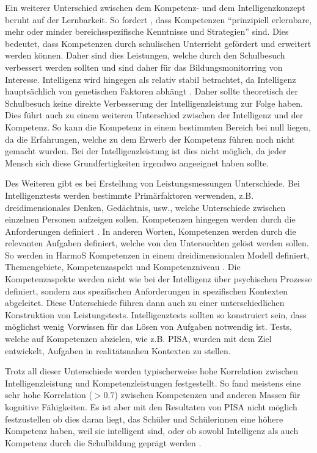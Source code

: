 Ein weiterer Unterschied zwischen dem Kompetenz- und dem Intelligenzkonzept beruht auf der Lernbarkeit. So fordert \citet[S. 22]{Baumert2001}, dass Kompetenzen "`prinzipiell erlernbare, mehr oder minder bereichsspezifische Kenntnisse und Strategien"' sind. Dies bedeutet, dass Kompetenzen durch schulischen Unterricht gefördert und erweitert werden können. Daher sind dies Leistungen, welche durch den Schulbesuch verbessert werden sollten und sind daher für das Bildungsmonitorring von Interesse. Intelligenz wird hingegen als relativ stabil betrachtet, da Intelligenz hauptsächlich von genetischen Faktoren abhängt \citep{Shakeshaft2013}. Daher sollte theoretisch der Schulbesuch keine direkte Verbesserung der Intelligenzleistung zur Folge haben. Dies führt auch zu einem weiteren Unterschied zwischen der Intelligenz und der Kompetenz. So kann die Kompetenz in einem bestimmten Bereich bei null liegen, da die Erfahrungen, welche zu dem Erwerb der Kompetenz führen noch nicht gemacht wurden. Bei der Intelligenzleistung ist dies nicht möglich, da jeder Mensch sich diese Grundfertigkeiten irgendwo angeeignet haben sollte.


Des Weiteren gibt es bei Erstellung von Leistungsmessungen Unterschiede. Bei Intelligenztests werden bestimmte Primärfaktoren verwenden, z.B. dreidimensionales Denken, Gedächtnis, usw., welche Unterschiede zwischen einzelnen Personen aufzeigen sollen. Kompetenzen hingegen werden durch die Anforderungen definiert \citep{Rychen}. In anderen Worten, Kompetenzen werden durch die relevanten Aufgaben definiert, welche von den Untersuchten gelöst werden sollen. So werden in HarmoS Kompetenzen in einem dreidimensionalen Modell definiert, Themengebiete, Kompetenzaspekt und Kompetenzniveau \citep{KonsotriumHarmoSNaturwissenschaften+2010}. Die Kompetenzaspekte werden nicht wie bei der Intelligenz über psychischen Prozesse definiert, sondern aus spezifischen Anforderungen in spezifischen Kontexten abgeleitet. Diese Unterschiede führen dann auch zu einer unterschiedlichen Konstruktion von Leistungstests. Intelligenztests sollten so konstruiert sein, dass möglichst wenig Vorwissen für das Lösen von Aufgaben notwendig ist. Tests, welche auf Kompetenzen abzielen, wie z.B. PISA, wurden mit dem Ziel entwickelt, Aufgaben in realitätsnahen  Kontexten zu stellen. 

Trotz all dieser Unterschiede werden typischerweise hohe Korrelation zwischen Intelligenzleistung und Kompetenzleistungen festgestellt. So fand \citet{Rindermann2006} meistens eine sehr hohe Korrelation ($ > $0.7) zwischen Kompetenzen und anderen Massen für kognitive Fähigkeiten. Es ist aber mit den Resultaten von PISA nicht möglich festzustellen ob dies daran liegt, das Schüler und Schülerinnen eine höhere Kompetenz haben, weil sie intelligent sind, oder ob sowohl Intelligenz als auch Kompetenz durch die Schulbildung geprägt werden \citep{Hartig2006}.



